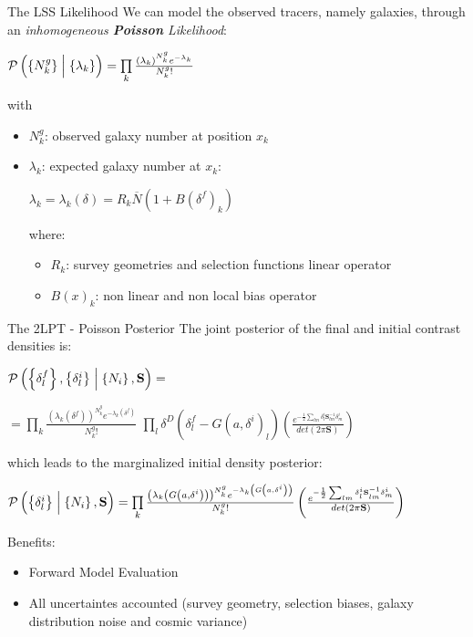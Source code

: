 \documentclass[10pt]{beamer}
\begin{document}
\begin{frame}[fragile]{The LSS Likelihood}
We can model the observed tracers, namely galaxies, through an 
\textit{inhomogeneous \textbf{Poisson} Likelihood}:\begin{center}
$\mathcal{P}\left(\{N_k^g\}\Bigm |\{\lambda_k\}\right)=\prod\limits_k\frac{\left(\lambda_k\right)^{N_k^g}e^{-\lambda_k}}{N^g_k!}$\end{center}\pause
  with \begin{itemize}
      \item $N_k^g$: observed galaxy number at position $x_k$
      \item $\lambda_k$: expected galaxy number at $x_k$:
      \begin{center}
  $\lambda_k=\lambda_k(\delta)=R_k\overline{N}\left(1+B(\delta^f)_k\right)$
  \end{center}\pause
  where:
  \begin{itemize}
      \item $R_k$: survey geometries and selection functions linear operator
      \item $B(x)_k$: non linear and non local bias operator
  \end{itemize}
  \end{itemize}
  

\end{frame}
\begin{frame}[fragile]{The 2LPT - Poisson Posterior}
The joint posterior of the final and initial contrast densities is:
\begin{center}
\begingroup\makeatletter{}\check@mathfonts
$\mathcal{P}\left(\left\{\delta_l^f\right\},\left\{\delta_l^i\right\}\Bigm|\left\{N_i\right\}, \textbf{S}\right)=$
\endgroup
\hfill

\pause

\begingroup\makeatletter{}\check@mathfonts
$=\prod\limits_k\frac{\left(\lambda_k\left(\delta^f\right)\right)^{N_k^g}e^{-\lambda_k\left(\delta^f\right)}}{N_k^g!}$\endgroup
\begingroup\makeatletter\def\f@size{7}\check@mathfonts
$\prod\limits_l\delta^D\left(\delta_l^f-G\left(a,\delta^i\right)_l\right)\left(\frac{e^{-\frac{1}{2}\sum_{lm}\delta_l^i\textbf{S}_{lm}^{-1}\delta_m^i}}{det\left(2\pi\textbf{S}\right)}\right)$\endgroup

\end{center}\pause
which leads to the marginalized initial density posterior:\begin{center}
$\mathcal{P}\left(\left\{\delta_l^i\right\}\Bigm|\left\{N_i\right\}, \textbf{S}\right)=\prod\limits_k \frac{\left(\lambda_k\left(G\left(a,\delta^i\right)\right)\right)^{N_k^g}e^{-\lambda_k\left(G\left(a,\delta^i\right)\right)}}{N_k^g!}\left(\frac{e^{-\frac{1}{2}\sum_{lm}\delta_l^i\textbf{S}_{lm}^{-1}\delta_m^i}}{det\left(2\pi\textbf{S}\right)}\right)$
\end{center}\pause
Benefits: 
\begin{itemize}
    \item Forward Model Evaluation
    \item All uncertaintes accounted (survey geometry, selection biases, galaxy distribution noise and cosmic variance)
\end{itemize}
\end{frame}
\end{document}
